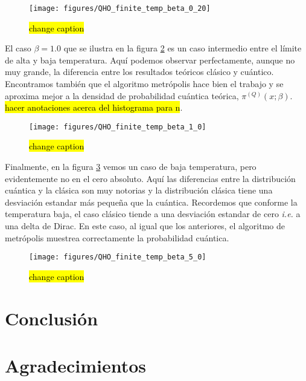 \documentclass[%
 reprint,
 amsmath,amssymb,
 aps,
 pra,
]{revtex4-2}
\begin{document}
\begin{figure}[t]
	\centering
	\texttt{[image: figures/QHO\_finite\_temp\_beta\_0\_20]}
	\caption{\hl{change caption}}
	\label{fig:beta_0.2}
\end{figure}

El caso $\beta=1.0$ que se ilustra en la figura \ref{fig:beta_1.0} es un caso intermedio entre el límite de alta y baja temperatura. Aquí podemos observar perfectamente, aunque no muy grande, la diferencia entre los resultados teóricos clásico y cuántico. Encontramos también que el algoritmo metrópolis hace bien el trabajo y se aproxima mejor a la densidad de probabilidad cuántica teórica, $\pi^{(Q)}(x;\beta)$. \hl{hacer anotaciones acerca del histograma para n}.

\begin{figure}[!b]
	\centering
	\texttt{[image: figures/QHO\_finite\_temp\_beta\_1\_0]}
	\caption{\hl{change caption}}
	\label{fig:beta_1.0}
\end{figure}

Finalmente, en la figura \ref{fig:beta_5.0} vemos un caso de baja temperatura, pero evidentemente no en el cero absoluto. Aquí las diferencias entre la distribución cuántica y la clásica son muy notorias y la distribución clásica tiene una desviación estandar más pequeña que la cuántica. Recordemos que conforme la temperatura baja, el caso clásico tiende a una desviación estandar de cero \textit{i.e.} a una delta de Dirac. En este caso, al igual que los anteriores, el algoritmo de metrópolis muestrea correctamente la probabilidad cuántica. 

\begin{figure}[t]
	\centering
	\texttt{[image: figures/QHO\_finite\_temp\_beta\_5\_0]}
	\caption{\hl{change caption}}
	\label{fig:beta_5.0}
\end{figure}

\section{Conclusión\label{Conclusiones}}

\section*{Agradecimientos}

\newpage

\appendix
\end{document}
